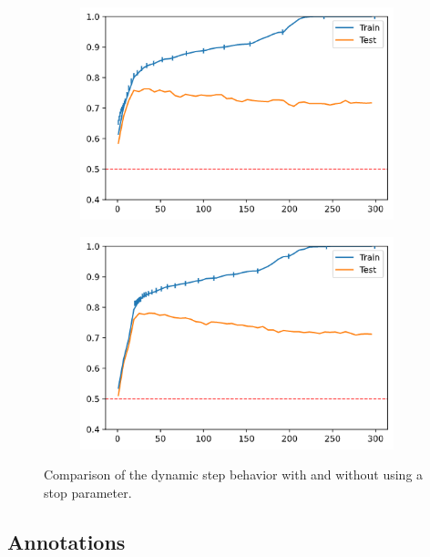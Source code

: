 \begin{figure}[H]
    \centering
    \begin{subfigure}[b]{0.4\linewidth}
        \includegraphics[width=\linewidth]{img/vanilla300-svmrfe-stopA.png}
    \end{subfigure}
    \begin{subfigure}[b]{0.4\linewidth}
        \includegraphics[width=\linewidth]{img/vanilla300-svmrfe-stopB.png}
    \end{subfigure}
    \caption{Comparison of the dynamic step behavior with and without using a stop parameter.}
    \label{fig:dynamicStep.vanilla.stop}
\end{figure}

\subsection{Annotations}


